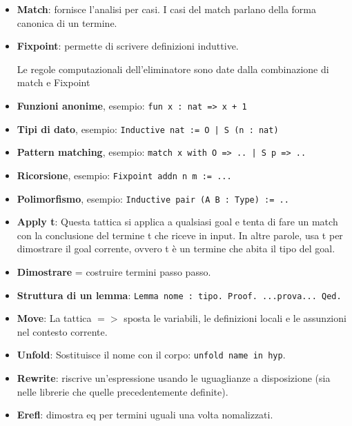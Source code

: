 \begin{itemize}
\item \textbf{Match}: fornisce l'analisi per casi. I casi del match parlano
della forma canonica di un termine.
 
\item \textbf{Fixpoint}: permette di scrivere definizioni induttive.

Le regole computazionali dell'eliminatore sono date dalla combinazione di match
e Fixpoint

\item \textbf{Funzioni anonime}, esempio: \texttt{fun x : nat => x + 1}

\item \textbf{Tipi di dato}, esempio: \texttt{Inductive nat := O | S (n : nat)}

\item \textbf{Pattern matching}, esempio: \texttt{match x with O => .. | S p => ..}

\item \textbf{Ricorsione}, esempio: \texttt{Fixpoint addn n m := ...}

\item \textbf{Polimorfismo}, esempio: \texttt{Inductive pair (A B : Type) := ..}

\item \textbf{Apply t}: Questa tattica si applica a qualsiasi goal e tenta di fare un
match con la conclusione del termine t che riceve in input.
In altre parole, usa t per dimostrare il goal corrente, ovvero t è un termine
che abita il tipo del goal.

\item \textbf{Dimostrare} = costruire termini passo passo.

\item \textbf{Struttura di un lemma}: \texttt{Lemma nome : tipo. Proof. ...prova... Qed.}

\item \textbf{Move}: La tattica $=>$ sposta le variabili, le definizioni locali e le
assunzioni nel contesto corrente.

\item \textbf{Unfold}: Sostituisce il nome con il corpo: \texttt{unfold name in hyp}.

\item \textbf{Rewrite}: riscrive un'espressione usando le uguaglianze a disposizione (sia nelle
librerie che quelle precedentemente definite).

\item \textbf{Erefl}: dimostra eq per termini uguali una volta nomalizzati.


\end{itemize}
